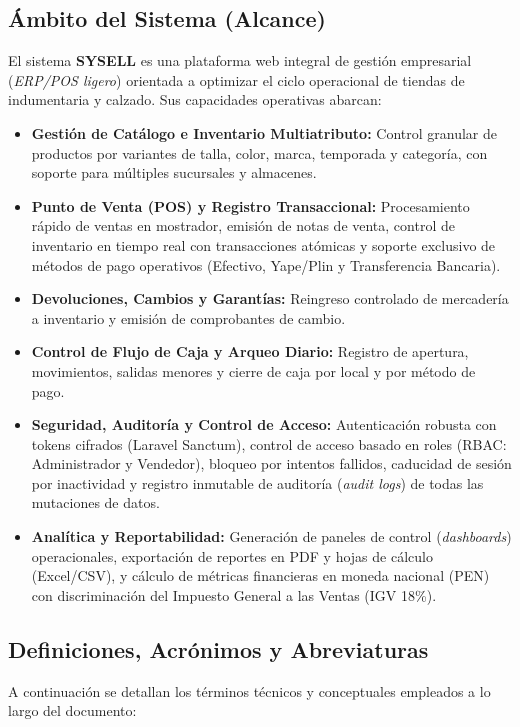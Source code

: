 \subsection{Ámbito del Sistema (Alcance)}
El sistema \textbf{SYSELL} es una plataforma web integral de gestión empresarial (\textit{ERP/POS ligero}) orientada a optimizar el ciclo operacional de tiendas de indumentaria y calzado. Sus capacidades operativas abarcan:
\begin{itemize}[leftmargin=*]
    \item \textbf{Gestión de Catálogo e Inventario Multiatributo:} Control granular de productos por variantes de talla, color, marca, temporada y categoría, con soporte para múltiples sucursales y almacenes.
    \item \textbf{Punto de Venta (POS) y Registro Transaccional:} Procesamiento rápido de ventas en mostrador, emisión de notas de venta, control de inventario en tiempo real con transacciones atómicas y soporte exclusivo de métodos de pago operativos (Efectivo, Yape/Plin y Transferencia Bancaria).
    \item \textbf{Devoluciones, Cambios y Garantías:} Reingreso controlado de mercadería a inventario y emisión de comprobantes de cambio.
    \item \textbf{Control de Flujo de Caja y Arqueo Diario:} Registro de apertura, movimientos, salidas menores y cierre de caja por local y por método de pago.
    \item \textbf{Seguridad, Auditoría y Control de Acceso:} Autenticación robusta con tokens cifrados (Laravel Sanctum), control de acceso basado en roles (RBAC: Administrador y Vendedor), bloqueo por intentos fallidos, caducidad de sesión por inactividad y registro inmutable de auditoría (\textit{audit logs}) de todas las mutaciones de datos.
    \item \textbf{Analítica y Reportabilidad:} Generación de paneles de control (\textit{dashboards}) operacionales, exportación de reportes en PDF y hojas de cálculo (Excel/CSV), y cálculo de métricas financieras en moneda nacional (PEN) con discriminación del Impuesto General a las Ventas (IGV 18\%).
\end{itemize}

\subsection{Definiciones, Acrónimos y Abreviaturas}
A continuación se detallan los términos técnicos y conceptuales empleados a lo largo del documento:

